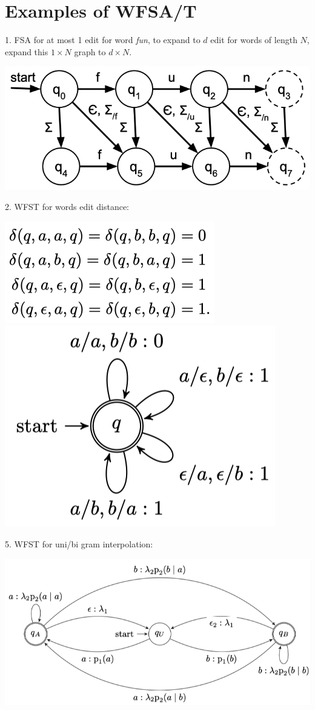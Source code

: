 \section{Examples of WFSA/T}
1. FSA for at most 1 edit for word \textit{fun}, to expand to $d$ edit for words of length $N$, expand this $1\times N$ graph to $d\times N$.
\begin{center}
    \includegraphics[width=.65\columnwidth]{img/FSA-edit.png}
\end{center}

2.  WFST for words edit distance:
\begin{center}
    \includegraphics[width=0.49\columnwidth]{img/WFST-edit-rules.png}
    \includegraphics[width=0.35\columnwidth]{img/WFST-edit.png}
\end{center}



5. WFST for uni/bi gram interpolation:
\begin{center}
    \includegraphics[width=0.5\columnwidth]{img/WFST-uni-bi-gram.png}
\end{center}




